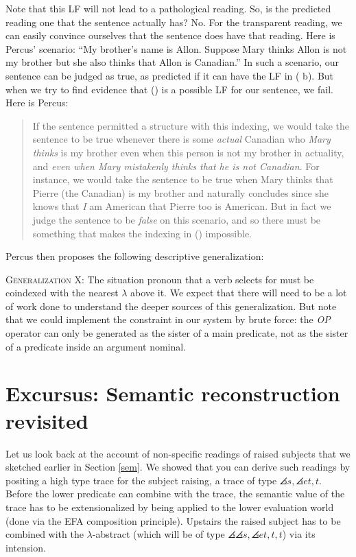 Note that this LF will not lead to a pathological reading. So, is the predicted
reading one that the sentence actually has? No. For the transparent reading, we
can easily convince ourselves that the sentence does have that reading. Here is
Percus' scenario: ``My brother's name is Allon. Suppose Mary thinks Allon is not
my brother but she also thinks that Allon is Canadian.'' In such a scenario, our
sentence can be judged as true, as predicted if it can have the LF in (\blastx
b). But when we try to find evidence that (\lastx) is a possible LF for our
sentence, we fail. Here is Percus:

\begin{quote}
  If the sentence permitted a structure with this indexing, we would take the
  sentence to be true whenever there is some \emph{actual} Canadian who
  \emph{Mary thinks} is my brother \dash even when this person is not my brother
  in actuality, and \emph{even when Mary mistakenly thinks that he is not
    Canadian}. For instance, we would take the sentence to be true when Mary
  thinks that Pierre (the Canadian) is my brother and naturally concludes \dash
  since she knows that \emph{I} am American \dash that Pierre too is American.
  But in fact we judge the sentence to be \emph{false} on this scenario, and so
  there must be something that makes the indexing in (\lastx) impossible.
\end{quote}
%
Percus then proposes the following descriptive generalization:

\ex \textsc{Generalization X}: The situation pronoun that a verb selects for
must be coindexed with the nearest $\lambda$ above it. \xe
%
We expect that there will need to be a lot of work done to understand the deeper
sources of this generalization. But note that we could implement the constraint
in our system by brute force: the \emph{OP} operator can only be generated as
the sister of a main predicate, not as the sister of a predicate inside an
argument nominal.

\section{Excursus: Semantic reconstruction revisited}

Let us look back at the account of non-specific readings of raised subjects that
we sketched earlier in Section \ref{sem}. We showed that you can derive such
readings by positing a high type trace for the subject raising, a trace of type
$\angles{s,\angles{et,t}}$. Before the lower predicate can combine with the
trace, the semantic value of the trace has to be extensionalized by being
applied to the lower evaluation world (done via the EFA composition principle).
Upstairs the raised subject has to be combined with the $\lambda$-abstract
(which will be of type $\angles{\angles{s,\angles{et,t}},t}$) via its intension.

